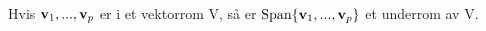 Hvis $\mathbf{v}_1, ..., \mathbf{v}_p$ er i et vektorrom V,
så er $\text{Span}\{\mathbf{v}_1, ..., \mathbf{v}_p\}$ et underrom av V.
